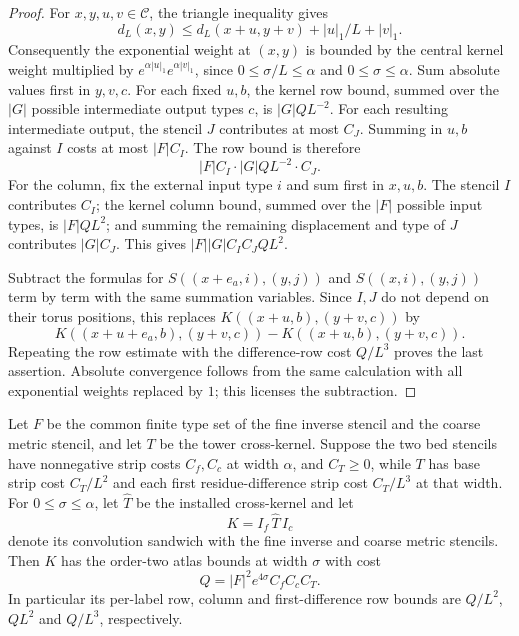 \begin{proof}
For $x,y,u,v\in\mathcal C$, the triangle inequality gives
\[
 d_L(x,y)\leq d_L(x+u,y+v)+|u|_1/L+|v|_1.
\]
Consequently the exponential weight at $(x,y)$ is bounded by the central
kernel weight multiplied by $e^{\alpha|u|_1}e^{\alpha|v|_1}$, since
$0\leq\sigma/L\leq\alpha$ and $0\leq\sigma\leq\alpha$. Sum absolute
values first in $y,v,c$.
For each fixed $u,b$, the kernel row bound, summed over the $|G|$ possible
intermediate output types $c$, is $|G|QL^{-2}$. For each resulting intermediate output,
the stencil $J$ contributes at most $C_J$. Summing in $u,b$ against $I$
costs at most $|F|C_I$. The row bound is therefore
\[
 |F|C_I\cdot |G|QL^{-2}\cdot C_J.
\]
For the column, fix the external input type $i$ and sum first in $x,u,b$.
The stencil $I$ contributes $C_I$;
the kernel column bound, summed over the $|F|$ possible input types, is
$|F|QL^2$; and summing the remaining displacement and type of $J$ contributes
$|G|C_J$. This gives $|F||G|C_IC_JQL^2$.

Subtract the formulas for $S((x+e_a,i),(y,j))$ and $S((x,i),(y,j))$
term by term with the same summation variables. Since $I,J$ do not depend on
their torus positions, this replaces $K((x+u,b),(y+v,c))$ by
\[
 K((x+u+e_a,b),(y+v,c))-K((x+u,b),(y+v,c)).
\]
Repeating the row estimate with the difference-row cost $Q/L^3$ proves the
last assertion. Absolute convergence follows from the same calculation with
all exponential weights replaced by $1$; this licenses the subtraction.
\end{proof}

\begin{theorem}
\label{thm:ex-lattice-response-atlas}
Let $F$ be the common finite type set of the fine inverse stencil and the
coarse metric stencil, and let $T$ be the tower cross-kernel. Suppose the two
bed stencils have nonnegative strip costs $C_f,C_c$ at width $\alpha$,
and $C_T\geq0$, while $T$ has
base strip cost $C_T/L^2$ and each first residue-difference strip cost
$C_T/L^3$ at that width. For $0\leq\sigma\leq\alpha$, let $\widehat T$
be the installed cross-kernel and let
\[
 K=I_f\,\widehat T\,I_c
\]
denote its convolution sandwich with the fine inverse and coarse metric
stencils. Then $K$ has the order-two atlas bounds at width $\sigma$ with
cost
\begin{equation}
 Q=|F|^2e^{4\sigma}C_f C_c C_T.
 \label{eq:ex-lattice-atlas-cost}
\end{equation}
In particular its per-label row, column and first-difference row bounds are
$Q/L^2$, $QL^2$ and $Q/L^3$, respectively.
\end{theorem}

